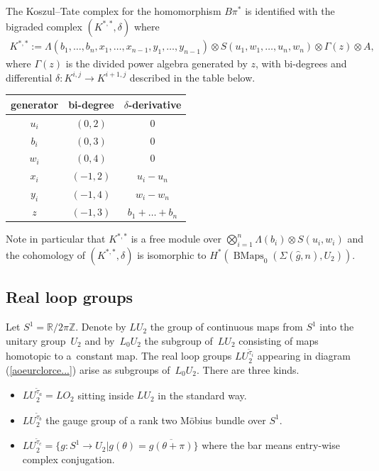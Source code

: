 \documentclass[10pt,a4paper]{amsart}
\numberwithin{equation}{section}
\begin{document}
The Koszul--Tate complex for the homomorphism $B\pi^*$ is identif\/ied with the bigraded complex $(K^{*,*},\delta)$ where
\begin{gather}\label{ktc}
 K^{*,*} := \Lambda(b_1,\dots,b_n, x_1,\dots,x_{n-1}, y_1,\dots,y_{n-1}) \otimes S(u_1,w_1,\dots, u_n,w_n) \otimes \Gamma(z)
\otimes A,
\end{gather}
where $\Gamma(z)$ is the divided power algebra generated by $z$, with bi-degrees and dif\/ferential $\delta\colon K^{i,j} \! \rightarrow K^{i+1, j}$ described in the table below.
\begin{center}
\begin{tabular}{|c|c|c|}
	\hline
generator & bi-degree & $\delta$-derivative \\
\hline
$u_i$ & $(0,2)$ & $0$ \\
$b_i$ & $(0,3)$ & $0$ \\
$w_i$ & $(0,4)$ & $0$\\
$x_i$ & $(-1,2)$ & $u_{i}-u_{n}$ \\
$y_i$ & $(-1,4)$ & $w_{i} -w_{n}$\\
$z$ & $(-1,3)$ & $b_1 +\dots+ b_n$\\
\hline
\end{tabular}
\end{center}

Note in particular that $K^{*,*}$ is a free module over $\bigotimes_{i=1}^n \Lambda(b_i) \otimes S(u_i, w_i)$ and the cohomology of $(K^{*,*},\delta) $ is isomorphic to $H^*(\operatorname{BMaps}_0(\Sigma(\hat{g}, n), U_2))$.

\subsection{Real loop groups}\label{orlecbularc}

Let $S^1 = {\mathbb R}/2\pi{\mathbb Z}$. Denote by $LU_2$ the group of continuous maps from $S^1$ into the unitary group~$U_2$ and by~$L_0U_2$ the subgroup of~$LU_2$ consisting of maps homotopic to a~constant map. The real loop groups $LU_2^{{\tilde{\tau}}_i}$ appearing in diagram (\ref{aoeurclorce...}) arise as subgroups of~$L_0U_2$. There are three kinds.
\begin{itemize}\itemsep=0pt
\item[(a)] $LU_2^{{\tilde{\tau}}_a} = LO_2$ sitting inside $LU_2$ in the standard way.
\item[(b)] $LU_2^{{\tilde{\tau}}_b}$ the gauge group of a rank two M\"obius bundle over $S^1$.
\item[(c)] $LU_2^{{\tilde{\tau}}_c} = \{ g\colon S^1 \rightarrow U_2 | g(\theta) = \overline{g(\theta + \pi)}\}$ where the bar means entry-wise complex conjugation.
\end{itemize}
\end{document}
